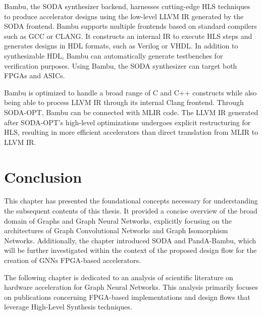 Bambu, the SODA synthesizer backend, harnesses cutting-edge HLS techniques to produce accelerator designs using the low-level LLVM IR generated by the SODA frontend.
Bambu supports multiple frontends based on standard compilers such as GCC or CLANG.
It constructs an internal IR to execute HLS steps and generates designs in HDL formats, such as Verilog or VHDL.
In addition to synthesizable HDL, Bambu can automatically generate testbenches for verification purposes.
Using Bambu, the SODA synthesizer can target both FPGAs and ASICs.

Bambu is optimized to handle a broad range of C and C++ constructs while also being able to process LLVM IR through its internal Clang frontend.
Through SODA-OPT, Bambu can be connected with MLIR code.
The LLVM IR generated after SODA-OPT's high-level optimizations undergoes explicit restructuring for HLS, resulting in more efficient accelerators than direct translation from MLIR to LLVM IR.

\section{Conclusion}
\label{sec:background_conclusion}%
This chapter has presented the foundational concepts necessary for understanding the subsequent contents of this thesis.
It provided a concise overview of the broad domain of Graphs and Graph Neural Networks, explicitly focusing on the architectures of Graph Convolutional Networks and Graph Isomorphism Networks.
Additionally, the chapter introduced SODA and PandA-Bambu, which will be further investigated within the context of the proposed design flow for the creation of GNNs FPGA-based accelerators.

The following chapter is dedicated to an analysis of scientific literature on hardware acceleration for Graph Neural Networks.
This analysis primarily focuses on publications concerning FPGA-based implementations and design flows that leverage High-Level Synthesis techniques.
